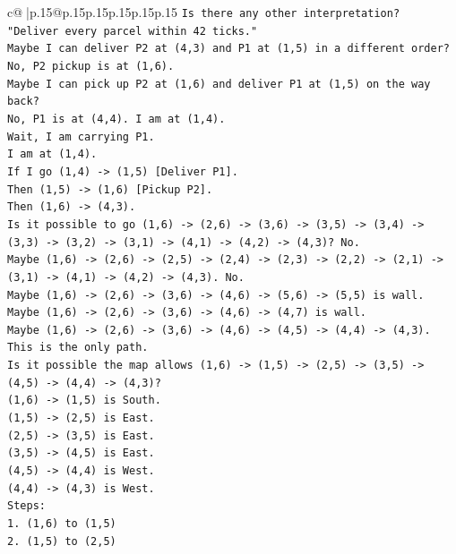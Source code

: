 \documentclass{article}
\begin{document}
{\begin{supertabular}{c@{$\;$}|p{.15\linewidth}@{}p{.15\linewidth}p{.15\linewidth}p{.15\linewidth}p{.15\linewidth}p{.15\linewidth}}
{{{\texttt{Is there any other interpretation?} \\
\texttt{"Deliver every parcel within 42 ticks."} \\
\texttt{Maybe I can deliver P2 at (4,3) and P1 at (1,5) in a different order?} \\
\texttt{No, P2 pickup is at (1,6).} \\
\texttt{Maybe I can pick up P2 at (1,6) and deliver P1 at (1,5) on the way back?} \\
\texttt{No, P1 is at (4,4). I am at (1,4).} \\
\texttt{Wait, I am carrying P1.} \\
\texttt{I am at (1,4).} \\
\texttt{If I go (1,4) {-}> (1,5) {[}Deliver P1{]}.} \\
\texttt{Then (1,5) {-}> (1,6) {[}Pickup P2{]}.} \\
\texttt{Then (1,6) {-}> (4,3).} \\
\texttt{Is it possible to go (1,6) {-}> (2,6) {-}> (3,6) {-}> (3,5) {-}> (3,4) {-}> (3,3) {-}> (3,2) {-}> (3,1) {-}> (4,1) {-}> (4,2) {-}> (4,3)? No.} \\
\texttt{Maybe (1,6) {-}> (2,6) {-}> (2,5) {-}> (2,4) {-}> (2,3) {-}> (2,2) {-}> (2,1) {-}> (3,1) {-}> (4,1) {-}> (4,2) {-}> (4,3). No.} \\
\texttt{Maybe (1,6) {-}> (2,6) {-}> (3,6) {-}> (4,6) {-}> (5,6) {-}> (5,5) is wall.} \\
\texttt{Maybe (1,6) {-}> (2,6) {-}> (3,6) {-}> (4,6) {-}> (4,7) is wall.} \\
\texttt{Maybe (1,6) {-}> (2,6) {-}> (3,6) {-}> (4,6) {-}> (4,5) {-}> (4,4) {-}> (4,3).} \\
\texttt{This is the only path.} \\
\texttt{Is it possible the map allows (1,6) {-}> (1,5) {-}> (2,5) {-}> (3,5) {-}> (4,5) {-}> (4,4) {-}> (4,3)?} \\
\texttt{(1,6) {-}> (1,5) is South.} \\
\texttt{(1,5) {-}> (2,5) is East.} \\
\texttt{(2,5) {-}> (3,5) is East.} \\
\texttt{(3,5) {-}> (4,5) is East.} \\
\texttt{(4,5) {-}> (4,4) is West.} \\
\texttt{(4,4) {-}> (4,3) is West.} \\
\texttt{Steps:} \\
\texttt{1. (1,6) to (1,5)} \\
\texttt{2. (1,5) to (2,5)} \\
}}}
\end{supertabular}}
\end{document}
